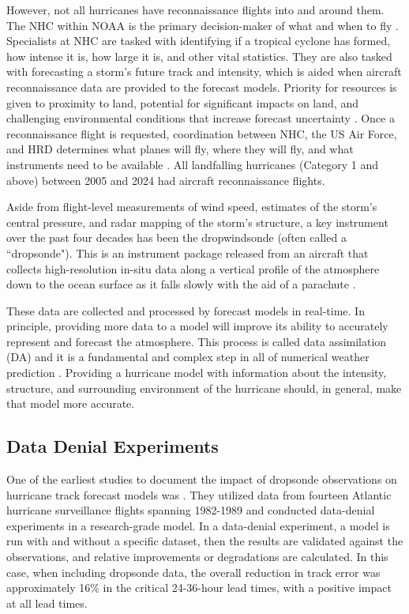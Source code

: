 \documentclass[12pt]{article}%
\begin{document}
However, not all hurricanes have reconnaissance flights into and around them. The NHC within NOAA is the primary decision-maker of what and when to fly \citep{OFCM2024,RappaportEA2009}. Specialists at NHC are tasked with identifying if a tropical cyclone has formed, how intense it is, how large it is, and other vital statistics. They are also tasked with forecasting a storm's future track and intensity, which is aided when aircraft reconnaissance data are provided to the forecast models. Priority for resources is given to proximity to land, potential for significant impacts on land, and challenging environmental conditions that increase forecast uncertainty \citep{Aberson2003, Majumdar2016}. Once a reconnaissance flight is requested, coordination between NHC, the US Air Force, and HRD determines what planes will fly, where they will fly, and what instruments need to be available \citep{OFCM2024}. All landfalling hurricanes (Category 1 and above) between 2005 and 2024 had aircraft reconnaissance flights.

Aside from flight-level measurements of wind speed, estimates of the storm's central pressure, and radar mapping of the storm's structure, a key instrument over the past four decades has been the dropwindsonde (often called a ``dropsonde"). This is an instrument package released from an aircraft that collects high-resolution in-situ data along a vertical profile of the atmosphere down to the ocean surface as it falls slowly with the aid of a parachute \citep{Hock_Franklin1999}.

These data are collected and processed by forecast models in real-time. In principle, providing more data to a model will improve its ability to accurately represent and forecast the atmosphere. This process is called data assimilation (DA) and it is a fundamental and complex step in all of numerical weather prediction \citep{Kalnay2003, Bannister2017}. Providing a hurricane model with information about the intensity, structure, and surrounding environment of the hurricane should, in general, make that model more accurate.

\subsection{Data Denial Experiments}

One of the earliest studies to document the impact of dropsonde observations on hurricane track forecast models was \citet{Franklin_DeMaria1992}. They utilized data from fourteen Atlantic hurricane surveillance flights spanning 1982-1989 and conducted data-denial experiments in a research-grade model. In a data-denial experiment, a model is run with and without a specific dataset, then the results are validated against the observations, and relative improvements or degradations are calculated. In this case, when including dropsonde data, the overall reduction in track error was approximately 16\% in the critical 24-36-hour lead times, with a positive impact at all lead times.
\end{document}
